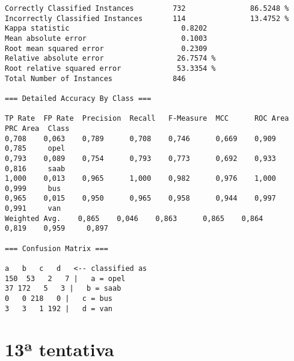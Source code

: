\documentclass[
	article,			%
	11pt,				%
	oneside,			%
	a4paper,			%
	english,			%
	brazil,				%
	sumario=tradicional
	]{abntex2}
\begin{document}
\begin{lstlisting}
Correctly Classified Instances         732               86.5248 %
Incorrectly Classified Instances       114               13.4752 %
Kappa statistic                          0.8202
Mean absolute error                      0.1003
Root mean squared error                  0.2309
Relative absolute error                 26.7574 %
Root relative squared error             53.3354 %
Total Number of Instances              846     

=== Detailed Accuracy By Class ===

TP Rate  FP Rate  Precision  Recall   F-Measure  MCC      ROC Area  PRC Area  Class
0,708    0,063    0,789      0,708    0,746      0,669    0,909     0,785     opel
0,793    0,089    0,754      0,793    0,773      0,692    0,933     0,816     saab
1,000    0,013    0,965      1,000    0,982      0,976    1,000     0,999     bus
0,965    0,015    0,950      0,965    0,958      0,944    0,997     0,991     van
Weighted Avg.    0,865    0,046    0,863      0,865    0,864      0,819    0,959     0,897     

=== Confusion Matrix ===

a   b   c   d   <-- classified as
150  53   2   7 |   a = opel
37 172   5   3 |   b = saab
0   0 218   0 |   c = bus
3   3   1 192 |   d = van

\end{lstlisting}

\newpage

\section{13ª tentativa}
\end{document}
